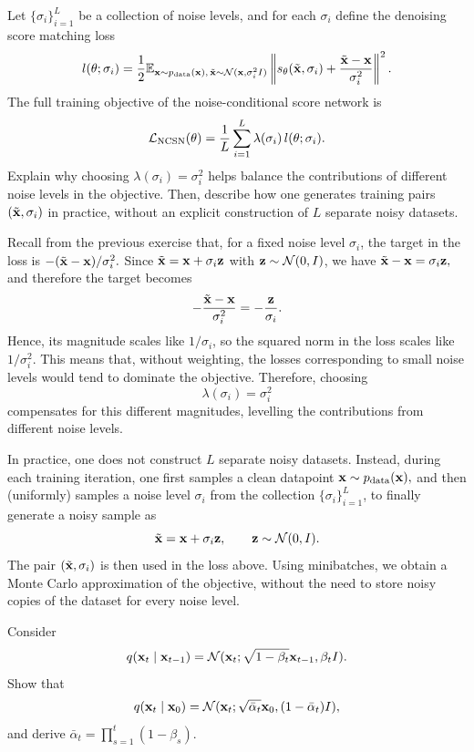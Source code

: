 \begin{exercise}
Let $\{\sigma_i\}_{i=1}^L$ be a collection of noise levels, and for each $\sigma_i$ define the denoising score matching loss
\[
l(\theta;\sigma_i)
=
\frac12
\mathbb{E}_{{ \mathbf{x}}\sim p_{\mathrm{data}}({ \mathbf{x}}),\,\tilde{{ \mathbf{x}}}\sim {\mathcal N}({ \mathbf{x}},\sigma_i^2 I)}
\left\|
s_\theta(\tilde{{ \mathbf{x}}},\sigma_i)+\frac{\tilde{{ \mathbf{x}}}-{ \mathbf{x}}}{\sigma_i^2}
\right\|^2.
\]
The full training objective of the noise-conditional score network is
\[
{\mathcal L}_{\mathrm{NCSN}}(\theta)
=
\frac1L\sum_{i=1}^L \lambda(\sigma_i)\,l(\theta;\sigma_i).
\]
Explain why choosing $\lambda(\sigma_i)=\sigma_i^2$ helps balance the contributions of different noise levels in the objective. Then, describe how one generates training pairs $(\tilde{{ \mathbf{x}}},\sigma_i)$ in practice, without an explicit construction of $L$ separate noisy datasets.
\end{exercise}

\begin{solution}
Recall from the previous exercise that, for a fixed noise level $\sigma_i$, the target in the loss is
\(
-(\tilde{{ \mathbf{x}}}-{ \mathbf{x}})/\sigma_i^2.
\)
Since $\tilde{{ \mathbf{x}}}={ \mathbf{x}}+\sigma_i { \mathbf{z}}$ with ${ \mathbf{z}}\sim{\mathcal N}(0,I)$, we have
\(
\tilde{{ \mathbf{x}}}-{ \mathbf{x}}=\sigma_i { \mathbf{z}},
\)
and therefore the target becomes
\[
-\frac{\tilde{{ \mathbf{x}}}-{ \mathbf{x}}}{\sigma_i^2}=-\frac{{ \mathbf{z}}}{\sigma_i}.
\]
Hence, its magnitude scales like $1/\sigma_i$, so the squared norm in the loss scales like $1/\sigma_i^2$. This means that, without weighting, the losses corresponding to small noise levels would tend to dominate the objective. Therefore, choosing
\[
\lambda(\sigma_i)=\sigma_i^2
\]
compensates for this different magnitudes, levelling the contributions from different noise levels.

In practice, one does not construct $L$ separate noisy datasets. Instead, during each training iteration, one first samples a clean datapoint
\(
{ \mathbf{x}}\sim p_{\mathrm{data}}({ \mathbf{x}}), 
\)
and then (uniformly) samples a noise level $\sigma_i$ from the collection $\{\sigma_i\}_{i=1}^L$, to finally generate a noisy sample as
\[
\tilde{{ \mathbf{x}}}={ \mathbf{x}}+\sigma_i { \mathbf{z}},
\qquad
{ \mathbf{z}}\sim{\mathcal N}(0,I).
\]
The pair $(\tilde{{ \mathbf{x}}},\sigma_i)$ is then used in the loss above. Using minibatches, we obtain a Monte Carlo approximation of the objective, without the need to store noisy copies of the dataset for every noise level.
\end{solution}

\begin{exercise}
Consider
\[
q({ \mathbf{x}}_t \mid { \mathbf{x}}_{t-1}) = {\mathcal N}({ \mathbf{x}}_t;\sqrt{1-\beta_t}{ \mathbf{x}}_{t-1},\beta_t I).
\]
Show that
\[
q({ \mathbf{x}}_t\mid{ \mathbf{x}}_0)={\mathcal N}({ \mathbf{x}}_t;\sqrt{\bar\alpha_t}{ \mathbf{x}}_0,(1-\bar\alpha_t)I),
\]
and derive $\bar\alpha_t=\prod_{s=1}^t(1-\beta_s)$.
\end{exercise}

